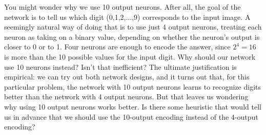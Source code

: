 \documentclass[a4paper,twoside,10pt]{book}
\begin{document}
You might wonder why we use 10 output neurons. After all, the goal of the network is to tell us which digit (0,1,2,$\ldots$,9) corresponds to the input image. A seemingly natural way of doing that is to use just 4 output neurons, treating each neuron as taking on a binary value, depending on whether the neuron's output is closer to 0 or to 1. Four neurons are enough to encode the answer, since $2^4=16$ is more than the 10 possible values for the input digit. Why should our network use 10 neurons instead? Isn't that inefficient? The ultimate justification is empirical: we can try out both network designs, and it turns out that, for this particular problem, the network with 10 output neurons learns to recognize digits better than the network with 4 output neurons. But that leaves us wondering why using 10 output neurons works better. Is there some heuristic that would tell us in advance that we should use the 10-output encoding instead of the 4-output encoding?
\end{document}

